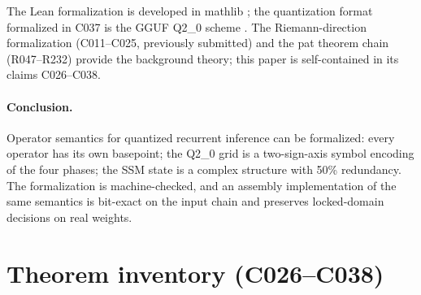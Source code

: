 \documentclass[sigplan,10pt,anonymous,review]{acmart}
\begin{document}
The Lean formalization is developed in mathlib \cite{mathlib2026}; the
quantization format formalized in C037 is the GGUF Q2\_0 scheme \cite{gguf2026}.
The Riemann-direction formalization (C011--C025, previously submitted) and the
pat theorem chain (R047--R232) provide the background theory; this paper is
self-contained in its claims C026--C038.

\paragraph{Conclusion.} Operator semantics for quantized recurrent inference
can be formalized: every operator has its own basepoint; the Q2\_0 grid is a
two-sign-axis symbol encoding of the four phases; the SSM state is a complex
structure with 50\% redundancy. The formalization is machine-checked, and an
assembly implementation of the same semantics is bit-exact on the input chain
and preserves locked-domain decisions on real weights.

\section*{Theorem inventory (C026--C038)}
\end{document}

